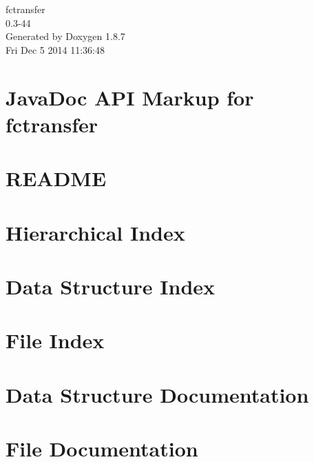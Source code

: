 \documentclass[twoside]{book}
\newcommand{\+}{\discretionary{\mbox{\scriptsize$\hookleftarrow$}}{}{}}
\newcommand{\clearemptydoublepage}{%
  \newpage{\pagestyle{empty}\cleardoublepage}%
}
\begin{document}
\begin{titlepage}
\vspace*{7cm}
\begin{center}%
{\Large fctransfer \\[1ex]\large 0.\+3-\/44 }\\
\vspace*{1cm}
{\large Generated by Doxygen 1.8.7}\\
\vspace*{0.5cm}
{\small Fri Dec 5 2014 11:36:48}\\
\end{center}
\end{titlepage}
\clearemptydoublepage
\tableofcontents
\clearemptydoublepage
{}

\chapter{Java\+Doc A\+P\+I Markup for fctransfer}
\label{index}
\chapter{R\+E\+A\+D\+M\+E}
\label{md_htdocs_README}

\chapter{Hierarchical Index}

\chapter{Data Structure Index}

\chapter{File Index}

\chapter{Data Structure Documentation}












\chapter{File Documentation}






\newpage
{}
{}
\printindex
\end{document}
